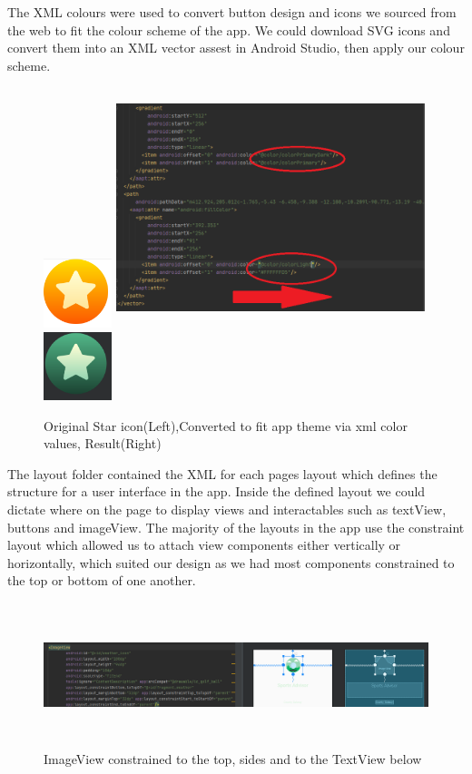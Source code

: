 The XML colours were used to convert button design and icons we sourced from the web to fit the colour scheme of the app. We could download SVG icons and convert them into an XML vector assest in Android Studio, then apply our colour scheme. \cite{ref13}

\begin{figure}[H]
    \centering
    \includegraphics[width=2cm, height = 2cm]{img/Start.PNG}
         \includegraphics[width=9cm, height = 7cm]{img/star_vector_code.PNG}
     \includegraphics[width=2cm, height = 2cm]{img/Star2.PNG}
    \caption{Original Star icon(Left),Converted to fit app theme via xml color values, Result(Right)}
    \label{fig:Original Star icon(Left),Converted to fit app theme via xml color values, Result(Right}
\end{figure}

The layout folder contained the XML for each pages layout which defines the structure for a user interface in the app. Inside the defined layout we could dictate where on the page to display views and interactables such as textView, buttons and imageView. The majority of the layouts in the app use the constraint layout which allowed us to attach view components either vertically or horizontally, which suited our design as we had most components constrained to the top or bottom of one another.
\begin{figure}[H]
    \centering
    \includegraphics[width=12cm, height = 4.2cm]{img/constraint_layout.PNG}
    \caption{ImageView constrained to the top, sides and to the TextView below}
    \label{fig:ImageView constrained to the top, sides and to the TextView below}
\end{figure}

